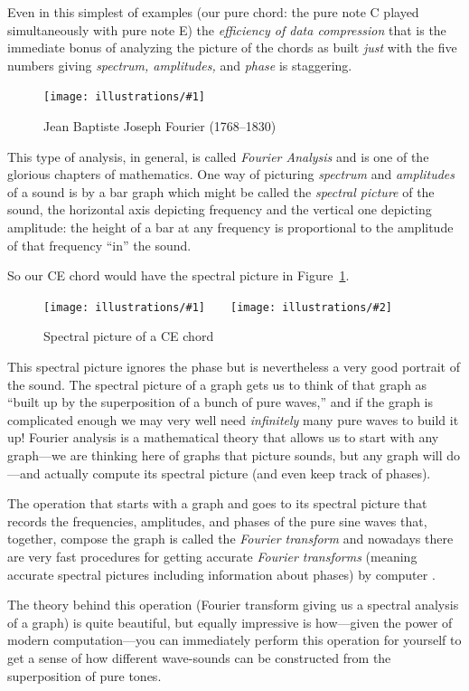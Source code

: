 \documentclass[openany]{book}
\newcommand{\ill}[3]{%
   \begin{figure}[H]%
   \vspace{-2ex}
   \centering%
   \texttt{[image: illustrations/\#1]}%
   \caption{#3}%
   \vspace{-2ex}
    \end{figure}}
\newcommand{\illtwo}[4]{%
   \begin{figure}[H]\centering%
   \texttt{[image: illustrations/\#1]}$\qquad$\texttt{[image: illustrations/\#2]}%
   \caption{#4}%
    \end{figure}}
\theoremstyle{plain}
\theoremstyle{definition}
\begin{document}
{  Even in this simplest of examples (our pure chord: the pure note C
  played simultaneously with pure note E) the {\em efficiency of data
    compression} that is the immediate bonus of analyzing the picture
  of the chords as built {\em just} with the five numbers giving {\em
    spectrum, amplitudes,} and {\em phase} is staggering.

\ill{fourier}{0.3}{Jean Baptiste Joseph Fourier (1768--1830)}

This type of analysis, in general, is called {\em Fourier Analysis}
and is one of the glorious chapters of mathematics.  One way of
picturing {\em spectrum} and {\em amplitudes} of a sound is by a bar
graph which might be called the {\em spectral picture} of the sound,
the horizontal axis depicting frequency and the vertical one depicting
amplitude: the height of a bar at any frequency is proportional to the
amplitude of that frequency ``in'' the sound.

So our CE chord would have the spectral picture in
Figure~\ref{fig:ce-spectral}.


\illtwo{sound-ce-general_sum}{sound-ce-general_sum-blips}{.45}
       {Spectral picture of a CE chord\label{fig:ce-spectral}}


This spectral picture ignores the phase but is nevertheless a very
good portrait of the sound.  The spectral picture of a graph gets us
to think of that graph as ``built up by the superposition of a bunch
of pure waves,'' and if the graph is complicated enough we may very well
need {\em infinitely} many pure waves to build it up!  Fourier analysis is a
mathematical theory that allows us to start with any graph---we are
thinking here of graphs that picture sounds, but any graph will
do---and actually compute its spectral picture (and even keep track of
phases).


The operation that starts with a graph and goes to its spectral
picture that records the frequencies, amplitudes, and phases of the
pure sine waves that, together, compose the graph is called the {\em
  Fourier transform} and nowadays there are very fast procedures for
getting accurate {\em Fourier transforms} (meaning accurate spectral
pictures including information about phases) by
computer .


The theory behind this operation (Fourier transform giving
us a spectral analysis of a graph) is quite beautiful, but equally
impressive is how---given the power of modern computation---you can
immediately perform this operation for yourself to get a sense of how
different wave-sounds can be constructed from the superposition of
pure tones.

}
\end{document}
